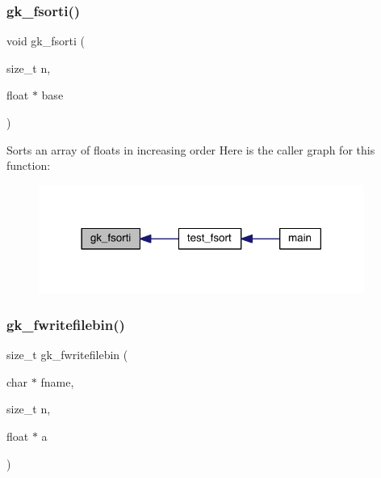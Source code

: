 \subsubsection{\texorpdfstring{gk\+\_\+fsorti()}{gk\_fsorti()}}
{\footnotesize\ttfamily void gk\+\_\+fsorti (\begin{DoxyParamCaption}\item[{size\+\_\+t}]{n,  }\item[{float $\ast$}]{base }\end{DoxyParamCaption})}

Sorts an array of floats in increasing order Here is the caller graph for this function\+:\nopagebreak
\begin{figure}[H]
\begin{center}
\leavevmode
\includegraphics[width=302pt]{a00077_a317c6a7c27cdf7ba3ebe40c948d7abcd_icgraph}
\end{center}
\end{figure}
\mbox{\label{a00077_a44ee9129d983bd435f96f9c1404f603d}} 
\subsubsection{\texorpdfstring{gk\+\_\+fwritefilebin()}{gk\_fwritefilebin()}}
{\footnotesize\ttfamily size\+\_\+t gk\+\_\+fwritefilebin (\begin{DoxyParamCaption}\item[{char $\ast$}]{fname,  }\item[{size\+\_\+t}]{n,  }\item[{float $\ast$}]{a }\end{DoxyParamCaption})}

